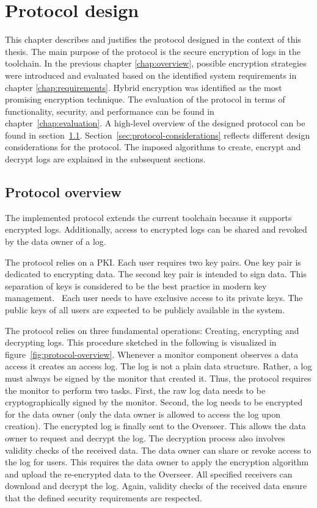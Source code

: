 \documentclass[../main.tex]{subfiles}
\begin{document}
\chapter{Protocol design}
\label{chap:design}

This chapter describes and justifies the protocol designed in the context of this thesis.
The main purpose of the protocol is the secure encryption of logs in the toolchain.
In the previous chapter \ref{chap:overview}, possible encryption strategies were introduced and evaluated based on the identified system requirements in chapter \ref{chap:requirements}.
Hybrid encryption was identified as the most promising encryption technique.
The evaluation of the protocol in terms of functionality, security, and performance can be found in chapter~\ref{chap:evaluation}.
A high-level overview of the designed protocol can be found in section~\ref{sec:overview}.
Section~\ref{sec:protocol-considerations} reflects different design considerations for the protocol.
The imposed algorithms to create, encrypt and decrypt logs are explained in the subsequent sections. 

\section{Protocol overview}
\label{sec:overview}

The implemented protocol extends the current toolchain because it supports encrypted logs.
Additionally, access to encrypted logs can be shared and revoked by the data owner of a log.

The protocol relies on a PKI.
Each user requires two key pairs.
One key pair is dedicated to encrypting data.
The second key pair is intended to sign data.
This separation of keys is considered to be the best practice in modern key management.~
Each user needs to have exclusive access to its private keys.
The public keys of all users are expected to be publicly available in the system.

The protocol relies on three fundamental operations: 
Creating, encrypting and decrypting logs.
This procedure sketched in the following is visualized in figure~\ref{fig:protocol-overview}.
Whenever a monitor component observes a data access it creates an access log.
The log is not a plain data structure.
Rather, a log must always be signed by the monitor that created it.
Thus, the protocol requires the monitor to perform two tasks.
First, the raw log data needs to be cryptographically signed by the monitor.
Second, the log needs to be encrypted for the data owner (only the data owner is allowed to access the log upon creation).
The encrypted log is finally sent to the Overseer.
This allows the data owner to request and decrypt the log.
The decryption process also involves validity checks of the received data.
The data owner can share or revoke access to the log for users.
This requires the data owner to apply the encryption algorithm and upload the re-encrypted data to the Overseer.
All specified receivers can download and decrypt the log.
Again, validity checks of the received data ensure that the defined security requirements are respected.
\end{document}
